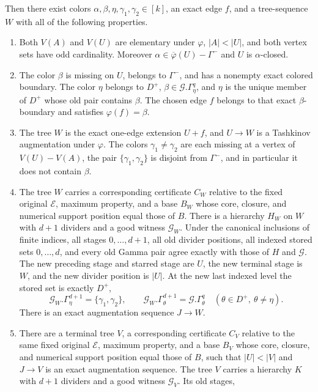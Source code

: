 \begin{theorem}
Then there exist colors
$\alpha,\beta,\eta,\gamma_1,\gamma_2\in[k]$, an exact edge $f$, and a
tree-sequence $W$ with all of the following properties.
\begin{enumerate}
\item Both $V(A)$ and $V(U)$ are elementary under $\varphi$,
$|A|<|U|$, and both vertex sets have odd cardinality.  Moreover
$\alpha\in\overline\varphi(U)-\Gamma^-$ and $U$ is
$\alpha$-closed.
\item The color $\beta$ is missing on $U$, belongs to $\Gamma^-$, and
has a nonempty exact colored boundary.  The color $\eta$ belongs to
$D^+$, $\beta\in\mathcal G.\Gamma^q_\eta$, and $\eta$ is the unique
member of $D^+$ whose old pair contains $\beta$.  The chosen edge $f$
belongs to that exact $\beta$-boundary and satisfies
$\varphi(f)=\beta$.
\item The tree $W$ is the exact one-edge extension $U+f$, and
$U\longrightarrow W$ is a Tashkinov augmentation under $\varphi$.
The colors $\gamma_1\ne\gamma_2$ are each missing at a vertex of
$V(U)-V(A)$, the pair $\{\gamma_1,\gamma_2\}$ is disjoint from
$\Gamma^-$, and in particular it does not contain $\beta$.
\item The tree $W$ carries a corresponding certificate $C_W$ relative
to the fixed original $\mathcal E$, maximum property, and a base $B_W$
whose core, closure, and numerical support position equal those of $B$.
There is a hierarchy $H_W$ on $W$ with $d+1$ dividers and a good witness
$\mathcal G_W$.  Under the canonical inclusions of finite indices,
all stages $0,\ldots,d+1$, all old divider positions, all indexed stored
sets $0,\ldots,d$, and every old Gamma pair agree exactly with those of
$H$ and $\mathcal G$.  The new preceding stage and starred stage are
$U$, the new terminal stage is $W$, and the new divider position is
$|U|$.  At the new last indexed level the stored set is exactly $D^+$,
\[
 \mathcal G_W.\Gamma^{d+1}_\eta=\{\gamma_1,\gamma_2\},\qquad
 \mathcal G_W.\Gamma^{d+1}_\theta=
     \mathcal G.\Gamma^q_\theta
       \quad(\theta\in D^+,\ \theta\ne\eta).
\]
There is an exact augmentation sequence $J\longrightarrow W$.
\item There are a terminal tree $V$, a corresponding certificate $C_V$
relative to the same fixed original $\mathcal E$, maximum property, and
a base $B_V$ whose core, closure, and numerical support position equal
those of $B$, such that $|U|<|V|$ and $J\longrightarrow V$ is an exact
augmentation sequence.  The tree $V$ carries a hierarchy $K$ with
$d+1$ dividers and a good witness $\mathcal G_V$.  Its old stages,

\end{enumerate}
\end{theorem}
